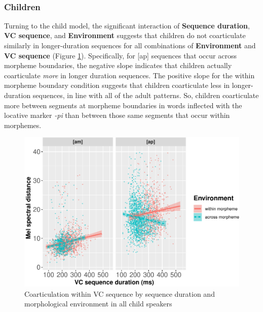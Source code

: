 \documentclass[a4paper,man,floatsintext,natbib,donotrepeattitle, apacite]{apa6}
\begin{document}
~

\subsubsection{Children}\label{children}

Turning to the child model, the significant interaction of \textbf{Sequence duration}, \textbf{VC sequence}, and \textbf{Environment} suggests that children do not coarticulate similarly in longer-duration sequences for all combinations of \textbf{Environment} and \textbf{VC sequence} (Figure \ref{fig:child-int-plot}). Specifically, for {[}ap{]} sequences that occur across morpheme boundaries, the negative slope indicates that children actually coarticulate \emph{more} in longer duration sequences. The positive slope for the within morpheme boundary condition suggests that children coarticulate less in longer-duration sequences, in line with all of the adult patterns. So, children coarticulate more between segments at morpheme boundaries in words inflected with the locative marker \emph{-pi} than between those same segments that occur within morphemes.

\begin{figure}[H]
\centering
\includegraphics{3_ch3_results_files/figure-latex/child-int-plot-1.pdf}
\caption{\label{fig:child-int-plot}Coarticulation within VC sequence by sequence duration and morphological environment in all child speakers}
\end{figure}
\end{document}
